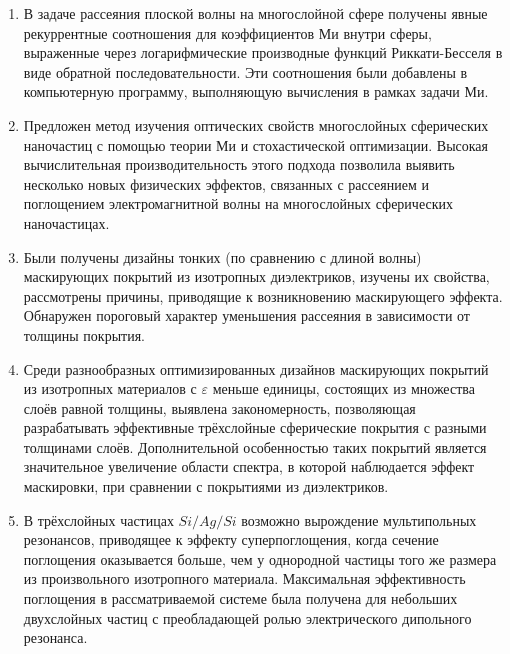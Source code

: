 \begin{enumerate}
  \item В задаче рассеяния плоской волны на многослойной сфере
    получены явные рекуррентные соотношения для коэффициентов Ми
    внутри сферы, выраженные через логарифмические производные функций
    Риккати-Бесселя в виде обратной последовательности.  Эти
    соотношения были добавлены в компьютерную программу, выполняющую
    вычисления в рамках задачи Ми.
  \item Предложен метод изучения оптических свойств
    многослойных сферических наночастиц с помощью теории Ми и
    стохастической оптимизации. Высокая вычислительная
    производительность этого подхода позволила выявить несколько новых
    физических эффектов, связанных с рассеянием и поглощением
    электромагнитной волны на многослойных сферических наночастицах.
  \item Были получены дизайны тонких (по сравнению с длиной волны)
    маскирующих покрытий из изотропных диэлектриков, изучены их
    свойства, рассмотрены причины, приводящие к возникновению
    маскирующего эффекта.  Обнаружен пороговый характер уменьшения
    рассеяния в зависимости от толщины покрытия.
  \item %
    Среди разнообразных оптимизированных дизайнов маскирующих покрытий из
    изотропных материалов с $\varepsilon$ меньше единицы, состоящих из
    множества слоёв равной толщины, выявлена закономерность,
    позволяющая разрабатывать эффективные трёхслойные сферические
    покрытия с разными толщинами слоёв. Дополнительной особенностью
    таких покрытий является значительное увеличение области спектра, в
    которой наблюдается эффект маскировки, при сравнении с покрытиями
    из диэлектриков. 
  \item В трёхслойных частицах $Si/Ag/Si$ возможно вырождение
    мультипольных резонансов, приводящее к эффекту суперпоглощения,
    когда сечение поглощения оказывается больше, чем у однородной
    частицы того же размера из произвольного изотропного
    материала. Максимальная эффективность поглощения в
    рассматриваемой системе была получена для небольших двухслойных
    частиц с преобладающей ролью электрического дипольного резонанса.
\end{enumerate}
